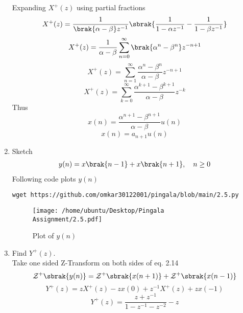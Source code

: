 \documentclass[journal,12pt,twocolumn]{IEEEtran}
\renewcommand\thesection{\arabic{section}}
\begin{document}
\begin{enumerate}[label=\thesection.\arabic*,ref=\thesection.\theenumi]
\solution
Expanding $X^{+}(z)$ using partial fractions
\begin{equation}
	X^{+}(z) = \frac{1}{\brak{\alpha - \beta}z^{-1}}\sbrak{\frac{1}{1 - \alpha{z^{-1}}} - \frac{1}{1 - \beta{z^{-1}}}}
\end{equation}
\begin{equation}
	X^{+}(z) = \frac{1}{\alpha - \beta}\sum_{n=0}^{\infty}\brak{{\alpha}^{n} - {\beta}^{n}}z^{-n+1}
\end{equation}
\begin{equation}
	X^{+}(z) = \sum_{n=1}^{\infty}\frac{{\alpha}^{n} - {\beta}^{n}}{\alpha - \beta}z^{-n+1}
\end{equation}
\begin{equation}
	X^{+}(z) = \sum_{k=0}^{\infty}\frac{{\alpha}^{k+1} - {\beta}^{k+1}}{\alpha - \beta}z^{-k}
\end{equation}
Thus
\begin{equation}
	x(n) = \frac{{\alpha}^{n+1} - {\beta}^{n+1}}{\alpha - \beta}u(n)
\end{equation}
\begin{equation}
	\boxed{x(n) = a_{n+1}u(n)}
\end{equation}
\item Sketch 
\begin{align}
	y(n)	 = x\brak{n-1} + x\brak{n+1},  \quad n \ge 0
	\label{eq:10-orig-diff-rev}
\end{align}
\solution
Following code plots $y(n)$
\begin{lstlisting}
wget https://github.com/omkar30122001/pingala/blob/main/2.5.py
\end{lstlisting}
\begin{figure}[!htp]
	\texttt{[image: /home/ubuntu/Desktop/Pingala Assignment/2.5.pdf]}
	\caption{Plot of $y(n)$}
	\label{fig:yn}
\end{figure}
\item Find $Y^{+}(z)$. \\
\solution
Take one sided Z-Transform on both sides of eq. 2.14
\begin{equation}
	\mathcal{Z}^{+}\sbrak{y(n)} = \mathcal{Z}^{+}\sbrak{x(n + 1)} + \mathcal{Z}^{+}\sbrak{x(n - 1)}
\end{equation}
\begin{equation}
	Y^{+}(z) = zX^{+}(z) - zx(0) + z^{-1}X^{+}(z) + zx(-1)
\end{equation}
\begin{equation}
	Y^{+}(z) = \frac{z + z^{-1}}{1 - z^{-1} - z^{-2}} - z
\end{equation}

\end{enumerate}
\end{document}
